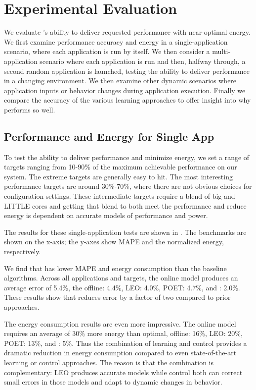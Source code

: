 \section{Experimental Evaluation}
We evaluate \SYSTEM{}'s ability to deliver requested performance with
near-optimal energy.  We first examine performance accuracy and energy
in a single-application scenario, where each application is run by
itself.  We then consider a multi-application scenario where each
application is run and then, halfway through, a second random
application is launched, testing the ability to deliver performance in
a changing environment.  
We then examine other dynamic scenarios where
application inputs or behavior changes during application execution.
Finally we compare the accuracy of the various learning approaches to
offer insight into why \SYSTEM{} performs so well.

\subsection{Performance and Energy for Single App}
To test the ability to deliver performance and minimize energy, we set
a range of targets ranging from 10-90\% of the maximum achievable
performance on our system. The extreme targets are generally easy to
hit. The most interesting performance targets are around 30\%-70\%,
where there are not obvious choices for configuration settings. These
intermediate targets require a blend of big and LITTLE cores and
getting that blend to both meet the performance and reduce energy is
dependent on accurate models of performance and power.

The results for these single-application tests are shown in
.  The benchmarks are shown on the
x-axis; the y-axes show MAPE and the normalized energy, respectively.

We find that \SYSTEM{} has lower MAPE and energy consumption than the
baseline algorithms. Across all applications and targets, the online
model produces an average error of 5.4\%, the offline: 4.4\%, LEO:
4.0\%, POET: 4.7\%, and \SYSTEM{}: 2.0\%.  These results show that
\SYSTEM{} reduces error by a factor of two compared to prior
approaches.  

The energy consumption results are even more impressive.  The online
model requires an average of 30\% more energy than optimal, offline: 16\%, LEO: 20\%, POET: 13\%, and \SYSTEM{}: 5\%.  Thus the combination
of learning and control provides a dramatic reduction in energy
consumption compared to even state-of-the-art learning or control
approaches.  The reason is that the combination is complementary: LEO
produces accurate models while control both can correct small errors
in those models and adapt to dynamic changes in behavior.


